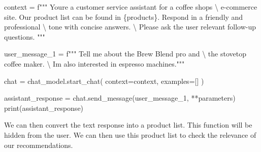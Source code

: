 \documentclass[
  letterpaper,
  DIV=11,
  numbers=noendperiod]{scrreprt}
\newenvironment{Shaded}{\begin{snugshade}}{\end{snugshade}}
\newcommand{\BuiltInTok}[1]{\textcolor[rgb]{0.00,0.23,0.31}{#1}}
\newcommand{\CharTok}[1]{\textcolor[rgb]{0.13,0.47,0.30}{#1}}
\newcommand{\NormalTok}[1]{\textcolor[rgb]{0.00,0.23,0.31}{#1}}
\newcommand{\OperatorTok}[1]{\textcolor[rgb]{0.37,0.37,0.37}{#1}}
\newcommand{\SpecialCharTok}[1]{\textcolor[rgb]{0.37,0.37,0.37}{#1}}
\newcommand{\SpecialStringTok}[1]{\textcolor[rgb]{0.13,0.47,0.30}{#1}}
\begin{document}
\begin{Shaded}
\begin{Highlighting}[]
\NormalTok{context }\OperatorTok{=} \SpecialStringTok{f"""}
\SpecialStringTok{You\textquotesingle{}re a customer service assistant for a coffee shop\textquotesingle{}s }\CharTok{\textbackslash{}}
\SpecialStringTok{e{-}commerce site. Our product list can be found in }\SpecialCharTok{\{}\NormalTok{products}\SpecialCharTok{\}}\SpecialStringTok{. Respond in a friendly and professional }\CharTok{\textbackslash{}}
\SpecialStringTok{tone with concise answers. }\CharTok{\textbackslash{}}
\SpecialStringTok{Please ask the user relevant follow{-}up questions.}
\SpecialStringTok{"""}

\NormalTok{user\_message\_1 }\OperatorTok{=} \SpecialStringTok{f"""}
\SpecialStringTok{Tell me about the Brew Blend pro and }\CharTok{\textbackslash{}}
\SpecialStringTok{the stovetop coffee maker. }\CharTok{\textbackslash{}}
\SpecialStringTok{I\textquotesingle{}m also interested in espresso machines."""}

\NormalTok{chat }\OperatorTok{=}\NormalTok{ chat\_model.start\_chat(}
\NormalTok{    context}\OperatorTok{=}\NormalTok{context,}
\NormalTok{    examples}\OperatorTok{=}\NormalTok{[]}
\NormalTok{)}

\NormalTok{assistant\_response }\OperatorTok{=}\NormalTok{ chat.send\_message(user\_message\_1, }\OperatorTok{**}\NormalTok{parameters)}
\BuiltInTok{print}\NormalTok{(assistant\_response)}
\end{Highlighting}
\end{Shaded}

We can then convert the text response into a product list. This function
will be hidden from the user. We can then use this product list to check
the relevance of our recommendations.
\end{document}
